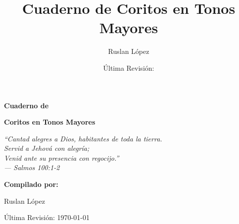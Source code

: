 \documentclass[12pt, spanish]{book}
\title{Cuaderno de Coritos en Tonos Mayores}
\author{Ruslan L\'opez}
\date{\'Ultima Revisi\'on:  \RevDate}
\newcommand{\RevDate}{\today}
\begin{document}
    \hypersetup{pageanchor=false}

    \begin{titlepage}
        \centering

        \vspace*{1cm}

        {\Huge\bfseries\sffamily{$\dagger$}\par}

        \vspace{1.5cm}

        {\Huge\bfseries\sffamily Cuaderno de\par}
        \vspace{0.5cm}
        {\Huge\bfseries\sffamily Coritos en Tonos Mayores\par}

        \vspace{2cm}

        \begin{center}
            \Large\itshape ``Cantad alegres a Dios, habitantes de toda la tierra.\\
            Servid a Jehov\'a con alegr\'ia;\\
            Venid ante su presencia con regocijo.''\\
            \vspace{0.3cm}
            --- Salmos 100:1-2
        \end{center}

        \vspace{2cm}

        {\Large\bfseries Compilado por:\par}
        \vspace{0.5cm}
        {\Large Ruslan L\'opez\par}

        \vfill

        {\large \'Ultima Revisi\'on: \RevDate\par}

        \vspace{1cm}

    \end{titlepage}

    \hypersetup{pageanchor=true}
    \ifWordBk
    \twocolumn
    \fi
\end{document}
